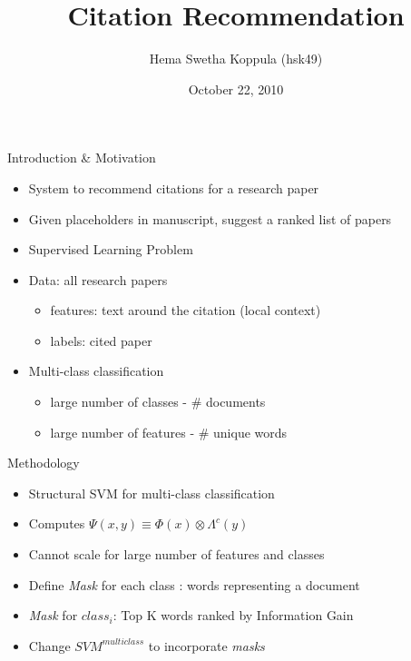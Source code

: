 \documentclass{beamer}
\title{Citation Recommendation}
\author{Hema Swetha Koppula (hsk49)}
\date{October 22, 2010}
\begin{document}
\begin{frame}
\titlepage
\end{frame}

\begin{frame}{Introduction \& Motivation}

\begin{itemize}
 \item System to recommend citations for a research paper
 \item Given placeholders in manuscript, suggest a ranked list of papers
 \item Supervised Learning Problem 
 \item Data: all research papers 
  \begin{itemize}
    \item features:  text around the citation (local context)
    \item labels: cited paper
   \end{itemize}
  \item Multi-class classification 
    \begin{itemize}
      \item large number of classes - \# documents
      \item large number of features - \# unique words
   \end{itemize}
\end{itemize}

\end{frame}


\begin{frame}{Methodology}
  \begin{itemize}
   \item Structural SVM for multi-class classification
   \item Computes $\Psi(x,y) \equiv \Phi(x) \otimes \Lambda^{c}(y)$ 
   \item Cannot scale for large number of features and classes
   \item Define \emph{Mask} for each class  :  words representing a document 
   \item \emph{Mask} for $class_{i}$: Top K words ranked by Information Gain
   \item Change $SVM^{multiclass}$ to incorporate \emph{masks}
  \end{itemize}
\end{frame}
\end{document}
